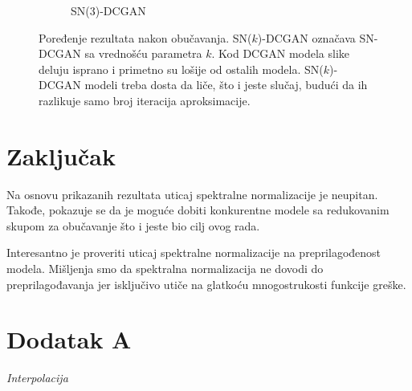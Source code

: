 \documentclass[12pt, a4paper]{article}
\begin{document}
\begin{figure}
\begin{subfigure}[b]{0.475\textwidth}
		\caption[]%
		{{\small SN(3)-DCGAN}}    
		\label{fig:mean and std of net44}
	\end{subfigure}
	\caption[] 
	{\small Poređenje rezultata nakon obučavanja. SN($k$)-DCGAN označava SN-DCGAN sa vrednošću parametra $k$. Kod DCGAN modela slike deluju isprano i primetno su lošije od ostalih modela. SN($k$)-DCGAN modeli treba dosta da liče, što i jeste slučaj, budući da ih razlikuje samo broj iteracija aproksimacije.} 
	\label{fig:comparison}
\end{figure}

\section{Zaključak}
Na osnovu prikazanih rezultata uticaj spektralne normalizacije je neupitan. Takođe, pokazuje se da je moguće dobiti konkurentne modele sa redukovanim skupom za obučavanje što i jeste bio cilj ovog rada.

Interesantno je proveriti uticaj spektralne normalizacije na preprilagođenost modela. Mišljenja smo da spektralna normalizacija ne dovodi do preprilagođavanja jer isključivo utiče na glatkoću mnogostrukosti funkcije greške.

\section*{Dodatak A}
\textit{Interpolacija}
\end{document}
